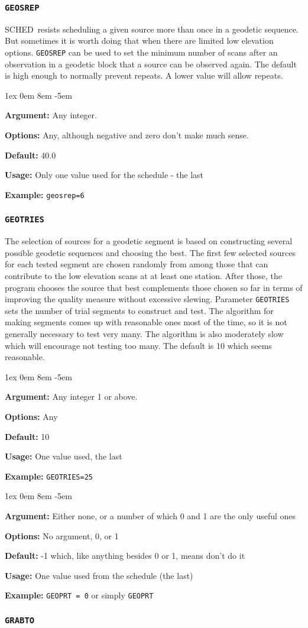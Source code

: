 \documentclass{report}
\newcommand{\schedb}{{\sc SCHED~}}
\newcommand{\rcwbox}[5]{
  \begin{list}{}{\parsep 1ex  \itemsep 0em
                 \leftmargin 8em  \itemindent -5em }
    \item {\bf Argument:} #1
    \item {\bf Options:}  #2
    \item {\bf Default:}  #3
    \item {\bf Usage:}    #4
    \item {\bf Example:}  #5
  \end{list}
}
\begin{document}
\subsubsection{\label{MP:GEOSREP}{\tt GEOSREP}}

\schedb resists scheduling a given source more than once in a
geodetic sequence.  But sometimes it is worth doing that when there
are limited low elevation options.  {\tt GEOSREP} can be used to
set the minimum number of scans after an observation in a geodetic
block that a source can be observed again.  The default is high
enough to normally prevent repeats.  A lower value will allow repeats.

\rcwbox
{Any integer.}
{Any, although negative and zero don't make much sense.}
{40.0}
{Only one value used for the schedule - the last}
{{\tt geosrep=6}}


\subsubsection{\label{MP:GEOTRIES}{\tt GEOTRIES}}

The selection of sources for a geodetic segment is based on
constructing several possible geodetic sequences and choosing the
best.  The first few selected sources for each tested segment are
chosen randomly from among those that can contribute to the low
elevation scans at at least one station.  After those, the program
chooses the source that best complements those chosen so far in
terms of improving the quality measure without excessive slewing.
Parameter {\tt GEOTRIES} sets the number of trial segments to
construct and test.  The algorithm for making segments comes up
with reasonable ones most of the time, so it is not generally
necessary to test very many.  The algorithm is also moderately
slow which will encourage not testing too many.  The default is
10 which seems reasonable.

\rcwbox
{Any integer 1 or above.}
{Any}
{10}
{One value used, the last}
{{\tt GEOTRIES=25}}


\rcwbox
{Either none, or a number of which 0 and 1 are the only useful ones}
{No argument, 0, or 1}
{-1 which, like anything besides 0 or 1, means don't do it}
{One value used from the schedule (the last)}
{{\tt GEOPRT = 0} or simply {\tt GEOPRT}}


\subsubsection{\label{MP:GRABTO}{\tt GRABTO}}
\end{document}
